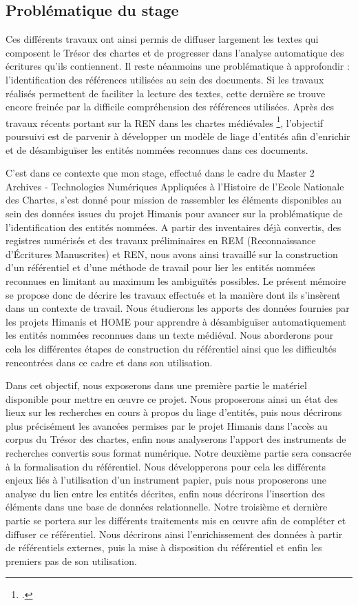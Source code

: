 \documentclass[a4paper,12pt,twoside]{book}
\begin{document}
	\subsection*{Problématique du stage}
	
	Ces différents travaux ont ainsi permis de diffuser largement les textes qui composent le Trésor des chartes et de progresser dans l'analyse automatique des écritures qu'ils contiennent. Il reste néanmoins une problématique à approfondir : l'identification des références utilisées au sein des documents. Si les travaux réalisés permettent de faciliter la lecture des textes, cette dernière se trouve encore freinée par la difficile compréhension des références utilisées. Après des travaux récents portant sur la REN dans les chartes médiévales \footcite{torres_aguilar_named_2021}, l'objectif poursuivi est de parvenir à développer un modèle de liage d'entités afin d'enrichir et de désambiguïser les entités nommées reconnues dans ces documents. 
	
	C'est dans ce contexte que mon stage, effectué dans le cadre du Master 2 Archives - Technologies Numériques Appliquées à l'Histoire de l'Ecole Nationale des Chartes, s'est donné pour mission de rassembler les éléments disponibles au sein des données issues du projet Himanis pour avancer sur la problématique de l'identification des entités nommées. A partir des inventaires déjà convertis, des registres numérisés et des travaux préliminaires en REM (Reconnaissance d'Écritures Manuscrites) et REN, nous avons ainsi travaillé sur la construction d'un référentiel et d'une méthode de travail pour lier les entités nommées reconnues en limitant au maximum les ambiguïtés possibles. Le présent mémoire se propose donc de décrire les travaux effectués et la manière dont ils s'insèrent dans un contexte de travail. Nous étudierons les apports des données fournies par les projets Himanis et HOME pour apprendre à désambiguïser automatiquement les entités nommées reconnues dans un texte médiéval. Nous aborderons pour cela les différentes étapes de construction du référentiel ainsi que les difficultés rencontrées dans ce cadre et dans son utilisation.
	
	Dans cet objectif, nous exposerons dans une première partie le matériel disponible pour mettre en œuvre ce projet. Nous proposerons ainsi un état des lieux sur les recherches en cours à propos du liage d'entités, puis nous décrirons plus précisément les avancées permises par le projet Himanis dans l'accès au corpus du Trésor des chartes, enfin nous analyserons l'apport des instruments de recherches convertis sous format numérique. Notre deuxième partie sera consacrée à la formalisation du référentiel. Nous développerons pour cela les différents enjeux liés à l'utilisation d'un instrument papier, puis nous proposerons une analyse du lien entre les entités décrites, enfin nous décrirons l'insertion des éléments dans une base de données relationnelle. Notre troisième et dernière partie se portera sur les différents traitements mis en œuvre afin de compléter et diffuser ce référentiel. Nous décrirons ainsi l'enrichissement des données à partir de référentiels externes, puis la mise à disposition du référentiel et enfin les premiers pas de son utilisation.
	
\end{document}
